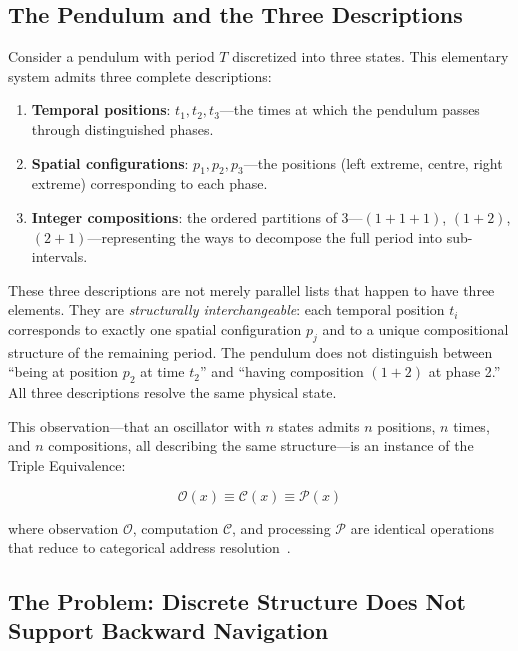 \documentclass[12pt,twocolumn]{article}
\begin{document}
\subsection{The Pendulum and the Three Descriptions}

Consider a pendulum with period $T$ discretized into three states. This elementary system admits three complete descriptions:

\begin{enumerate}[leftmargin=*]
\item \textbf{Temporal positions}: $t_1, t_2, t_3$---the times at which the pendulum passes through distinguished phases.
\item \textbf{Spatial configurations}: $p_1, p_2, p_3$---the positions (left extreme, centre, right extreme) corresponding to each phase.
\item \textbf{Integer compositions}: the ordered partitions of 3---$(1{+}1{+}1)$, $(1{+}2)$, $(2{+}1)$---representing the ways to decompose the full period into sub-intervals.
\end{enumerate}

These three descriptions are not merely parallel lists that happen to have three elements. They are \emph{structurally interchangeable}: each temporal position $t_i$ corresponds to exactly one spatial configuration $p_j$ and to a unique compositional structure of the remaining period. The pendulum does not distinguish between ``being at position $p_2$ at time $t_2$'' and ``having composition $(1{+}2)$ at phase 2.'' All three descriptions resolve the same physical state.

This observation---that an oscillator with $n$ states admits $n$ positions, $n$ times, and $n$ compositions, all describing the same structure---is an instance of the Triple Equivalence:

\begin{equation}
\label{eq:triple_intro}
\mathcal{O}(x) \equiv \mathcal{C}(x) \equiv \mathcal{P}(x)
\end{equation}

where observation $\mathcal{O}$, computation $\mathcal{C}$, and processing $\mathcal{P}$ are identical operations that reduce to categorical address resolution~\cite{turing1936computable,shannon1948mathematical}.

\subsection{The Problem: Discrete Structure Does Not Support Backward Navigation}
\end{document}
